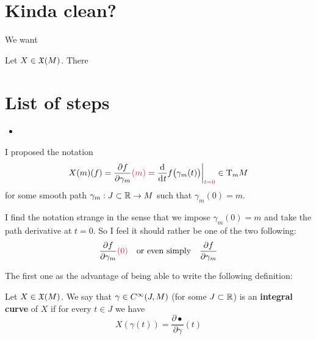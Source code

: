 \section{Kinda clean?}

	We want

	\begin{lemma}
		Let $X \in \mathfrak{X}(M)$. There 
	\end{lemma}

\section{List of steps}
	
	\begin{itemize}
		\item 
	\end{itemize}

	I proposed the notation
	$$
		X(m)(f) = \frac{\partial{f}}{\partial{\gamma_m}}{\color{Red}(m)} = \frac{\d}{\di{t}} f\big( \gamma_m(t) \big) \bigg|_{\color{Red}t=0} \in \T_m{M}
	$$
	for some smooth path $\gamma_m: J \subset \mathbb{R} \to M$ such that $\gamma_m(0) = m$.

	I find the notation strange in the sense that we impose $\gamma_m(0) = m$ and take the path derivative at $t=0$. So I feel it should rather be one of the two following:
	$$
		\frac{\partial{f}}{\partial{\gamma_m}}{\color{Red}(0)} \quad \text{or even simply} \quad \frac{\partial{f}}{\partial{\gamma_m}}
	$$

	The first one as the advantage of being able to write the following definition:

	\begin{definition}
		Let $X \in \mathfrak{X}(M)$.
		We say that $\gamma \in C^\infty(J,M)$ (for some $J \subset \mathbb{R}$) is an \textbf{integral curve} of $X$ if for every $t \in J$ we have
		$$
			X(\gamma(t)) = \frac{\partial \bullet}{\partial \gamma}(t)
		$$

		




	\end{definition}

